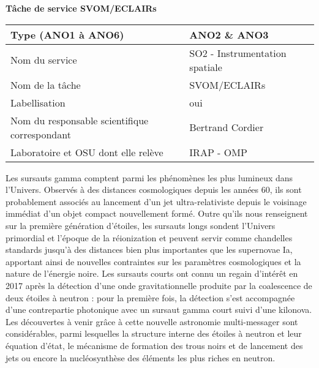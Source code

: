 \documentclass[12pt,onecolumn]{article}
\title{	
\vspace*{-2.5cm}
}
\author{\tiny} %
\date{\tiny }%
\begin{document}


\renewcommand{\headrulewidth}{1pt}
\pagestyle{fancy}
\fancyhf{}
\rfoot{\thepage / \pageref{LastPage}}

\begin{center}
\Large \textbf{Tâche de service SVOM/ECLAIRs}
\end{center}
\normalfont
\vspace*{-0.4cm}
\begin{table}[h!]
\centering
\label{my-label}
\begin{tabular}{|l|l|}
\hline
Type (ANO1 \`{a} ANO6) & ANO2 \& ANO3 \\ \hline
Nom du service & SO2 - Instrumentation spatiale \\ \hline
Nom de la t\^{a}che & SVOM/ECLAIRs \\ \hline
Labellisation & oui \\ \hline
Nom du responsable scientifique correspondant & Bertrand Cordier \\ \hline
Laboratoire et OSU dont elle rel\`eve & IRAP - OMP \\ \hline
\end{tabular}
\end{table}


Les sursauts gamma comptent parmi les phénomènes les plus lumineux dans l'Univers. Observés à des distances cosmologiques depuis les années 60, ils sont probablement associés au lancement d'un jet ultra-relativiste depuis le voisinage immédiat d'un objet compact nouvellement formé. Outre qu'ils nous renseignent sur la première génération d'étoiles, les sursauts longs sondent l'Univers primordial et l'époque de la réionization et peuvent servir comme chandelles standards jusqu'à des distances bien plus importantes que les supernovae Ia, apportant ainsi de nouvelles contraintes sur les paramètres cosmologiques et la nature de l'énergie noire. Les sursauts courts ont connu un regain d'intérêt en 2017 après la détection d'une onde gravitationnelle produite par la coalescence de deux étoiles à neutron : pour la première fois, la détection s'est accompagnée d'une contrepartie photonique avec un sursaut gamma court suivi d'une kilonova. Les découvertes à venir grâce à cette nouvelle astronomie multi-messager sont considérables, parmi lesquelles la structure interne des étoiles à neutron et leur équation d'état, le mécanisme de formation des trous noirs et de lancement des jets ou encore la nucléosynthèse des éléments les plus riches en neutron.
\end{document}
